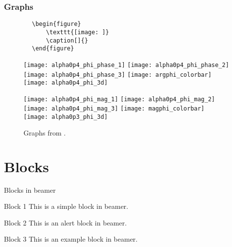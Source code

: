 \documentclass[x11names,aspectratio=32]{beamer}
\begin{document}
\begin{frame}
    \frametitle{Graphs}
    \scriptsize
    \begin{verbatim}
        \begin{figure}
            \texttt{[image: ]}
            \caption[]{}
        \end{figure}
    \end{verbatim}

    \vfill{}

    \begin{figure}
        \texttt{[image: alpha0p4\_phi\_phase\_1]}
        \texttt{[image: alpha0p4\_phi\_phase\_2]}
        \texttt{[image: alpha0p4\_phi\_phase\_3]}
        \texttt{[image: argphi\_colorbar]}
        \texttt{[image: alpha0p4\_phi\_3d]}

        \texttt{[image: alpha0p4\_phi\_mag\_1]}
        \texttt{[image: alpha0p4\_phi\_mag\_2]}
        \texttt{[image: alpha0p4\_phi\_mag\_3]}
        \texttt{[image: magphi\_colorbar]}
        \texttt{[image: alpha0p3\_phi\_3d]}
        \caption{Graphs from \smartcite{East2022}.}
    \end{figure}
\end{frame}


\section{Blocks}
\begin{frame}[fragile]{Blocks in beamer}{}
    

    \begin{block}{Block 1}
        This is a simple block in beamer.
    \end{block}

    \begin{alertblock}{Block 2}
        This is an alert block in beamer.
    \end{alertblock}

    \begin{exampleblock}{Block 3}
        This is an example block in beamer.
    \end{exampleblock}
\end{frame}
\end{document}
